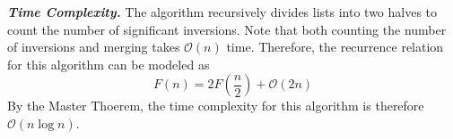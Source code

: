\documentclass[11pt]{article}
\begin{document}
\begin{enumerate}[leftmargin=*,start=0]
\hfill

\textbf{\textit{Time Complexity.}} The algorithm recursively divides lists into two halves to count the number of 
significant inversions. Note that both counting the number of inversions and merging takes $\mathcal{O}(n)$ time. Therefore, the 
recurrence relation for this algorithm can be modeled as 
\[F(n) = 2F(\frac{n}{2}) + \mathcal{O}(2n)\]
By the Master Thoerem, the time complexity for this algorithm is therefore $\mathcal{O}(n \log n)$. 



\end{enumerate}
\end{document}
